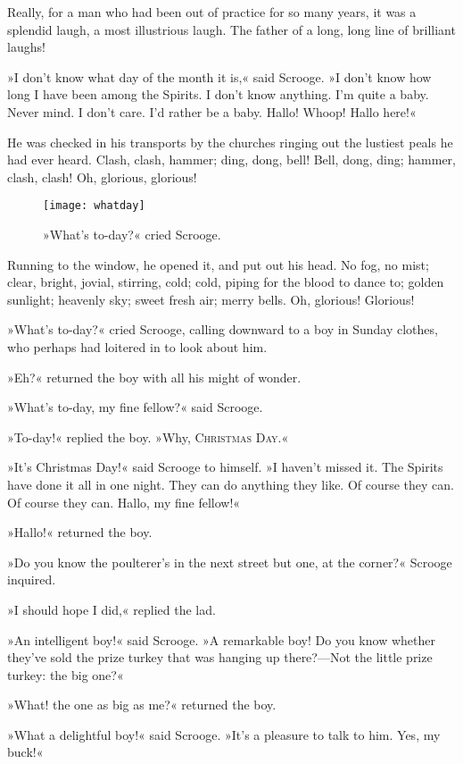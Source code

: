 Really, for a man who had been out of practice for so many years, it was a splendid laugh, a most illustrious laugh. The father of a long, long line of brilliant laughs!

»I don't know what day of the month it is,« said Scrooge. »I don't know how long I have been among the Spirits. I don't know anything. I'm quite a baby. Never mind. I don't care. I'd rather be a baby. Hallo! Whoop! Hallo here!«

He was checked in his transports by the churches ringing out the lustiest peals he had ever heard. Clash, clash, hammer; ding, dong, bell! Bell, dong, ding; hammer, clash, clash! Oh, glorious, glorious!

\begin{figure}[tbh]
\centering
\texttt{[image: whatday]}
\caption{»What's to-day?« cried Scrooge.}
\end{figure}


Running to the window, he opened it, and put out his head. No fog, no mist; clear, bright, jovial, stirring, cold; cold, piping for the blood to dance to; golden sunlight; heavenly sky; sweet fresh air; merry bells. Oh, glorious! Glorious!

»What's to-day?« cried Scrooge, calling downward to a boy in Sunday clothes, who perhaps had loitered in to look about him.

»Eh?« returned the boy with all his might of wonder.

»What's to-day, my fine fellow?« said Scrooge.

»To-day!« replied the boy. »Why, \textsc{Christmas Day.}«

»It's Christmas Day!« said Scrooge to himself. »I haven't missed it. The Spirits have done it all in one night. They can do anything they like. Of course they can. Of course they can. Hallo, my fine fellow!«

»Hallo!« returned the boy.

»Do you know the poulterer's in the next street but one, at the corner?« Scrooge inquired.

»I should hope I did,« replied the lad.

»An intelligent boy!« said Scrooge. »A remarkable boy! Do you know whether they've sold the prize turkey that was hanging up there?---Not the little prize turkey: the big one?«

»What! the one as big as me?« returned the boy.

»What a delightful boy!« said Scrooge. »It's a pleasure to talk to him. Yes, my buck!«

